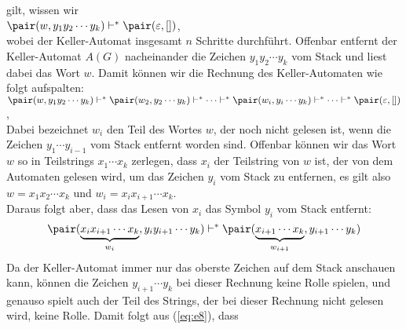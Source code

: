 \begin{enumerate}
            gilt, wissen wir 
            \\[0.2cm]
            \hspace*{1.3cm}
            $\pair(w,y_1 y_2 \cdots y_k) \vdash^* \pair(\varepsilon, [])$,
            \\[0.2cm]
            wobei der Keller-Automat insgesamt $n$ Schritte durchf\"uhrt.  Offenbar entfernt
            der Keller-Automat $A(G)$ nacheinander die Zeichen $y_1 y_2 \cdots y_k$ vom
            Stack und liest dabei das Wort $w$.  Damit k\"onnen wir die Rechnung des
            Keller-Automaten wie folgt aufspalten:
            \\[0.2cm]
            \hspace*{1.3cm}
            $\pair(w,y_1 y_2 \cdots y_k) \vdash^* \pair(w_2,y_2 \cdots y_k) \vdash^*
            \cdots \vdash^* \pair(w_i, y_i \cdots y_k) \vdash^* \cdots \vdash^* \pair(\varepsilon, [])$,
            \\[0.2cm]
            Dabei bezeichnet $w_i$ den Teil des Wortes $w$, der noch nicht gelesen ist,
            wenn die Zeichen $y_1 \cdots y_{i-1}$ vom Stack entfernt worden sind.
            Offenbar k\"onnen wir 
            das Wort $w$ so in Teilstrings $x_1 \cdots x_k$ zerlegen, dass $x_i$ der
            Teilstring von $w$ ist, der von dem Automaten gelesen wird, um das Zeichen
            $y_i$ vom Stack zu entfernen, es gilt also
            \\[0.2cm]
            \hspace*{1.3cm}
            $w = x_1 x_2 \cdots x_k$ \quad und \quad $w_i = x_i x_{i+1} \cdots x_k$.
            \\[0.2cm]
            Daraus folgt aber, dass das Lesen von $x_i$ das Symbol $y_i$ vom Stack
            entfernt:
            \begin{equation}
              \label{eq:e8}
              \pair(\underbrace{x_i x_{i+1} \cdots x_k}_{w_i}, y_i y_{i+1} \cdots y_{k})
              \vdash^* \pair(\underbrace{x_{i+1} \cdots x_k}_{w_{i+1}}, y_{i+1} \cdots y_{k})
            \end{equation}
            Da der Keller-Automat immer nur das oberste Zeichen auf dem Stack anschauen
            kann, k\"onnen die Zeichen $y_{i+1} \cdots y_{k}$ bei dieser Rechnung keine
            Rolle spielen, und genauso spielt auch der Teil des Strings, der bei dieser
            Rechnung nicht gelesen wird, keine Rolle.  Damit folgt aus (\ref{eq:e8}), dass 
            \begin{equation}
              \label{eq:e9}

\end{equation}
\end{enumerate}
